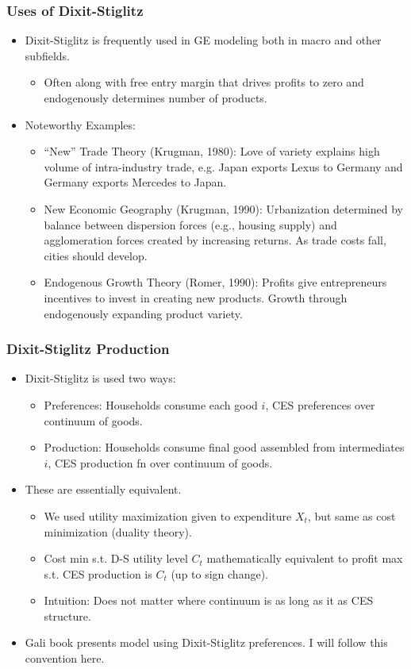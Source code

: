 \documentclass[english,xcolor=svgnames]{beamer}
\begin{document}
\begin{frame}
\frametitle{Uses of Dixit-Stiglitz
}
\begin{itemize}
	\item Dixit-Stiglitz is frequently used in GE modeling both in macro and other subfields.
	\begin{itemize}
		\item Often along with free entry margin that drives profits to zero and endogenously determines number of products.
	\end{itemize}
	\item Noteworthy Examples:
	\begin{itemize}
		\item ``New'' Trade Theory (Krugman, 1980): Love of variety explains high volume of intra-industry trade, e.g. Japan exports Lexus to Germany and Germany exports Mercedes to Japan.
		\item New Economic Geography (Krugman, 1990): Urbanization determined by balance between dispersion forces (e.g., housing supply) and agglomeration forces created by increasing returns. As trade costs fall, cities should develop.
		\item Endogenous Growth Theory (Romer, 1990): Profits give entrepreneurs incentives to invest in creating new products. Growth through endogenously expanding product variety.
	\end{itemize}
\end{itemize}
\end{frame}


\begin{frame}
\frametitle{Dixit-Stiglitz Production
}
\begin{itemize}
	\item Dixit-Stiglitz is used two ways:
\begin{itemize}
	\item Preferences: Households consume each good $i$,
CES preferences over continuum of goods.
	\item Production: Households consume final good assembled from
intermediates $i$, CES production fn over continuum of goods.
\end{itemize}
	\item These are essentially equivalent.
	\begin{itemize}
	\item We used utility maximization given to expenditure $X_t$, but same as cost minimization (duality theory).
	\item Cost min s.t. D-S utility level $C_t$ mathematically equivalent to profit max s.t. CES production is $C_t$ (up to sign change).
	\item Intuition: Does not matter where continuum is as long as it as CES structure.
\end{itemize}
\item Gali book presents model using Dixit-Stiglitz preferences. I will follow this convention here.
\end{itemize}
\end{frame}
\end{document}
